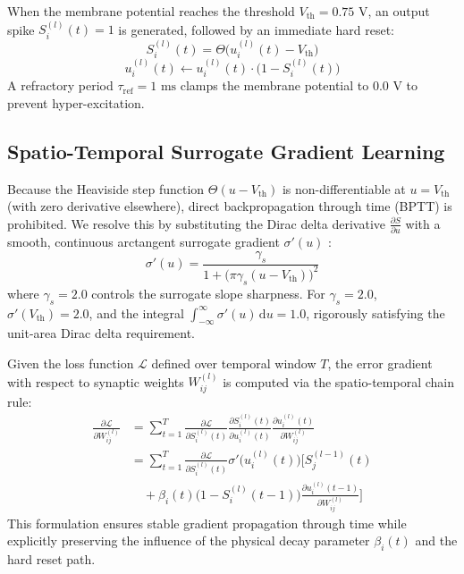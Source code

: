 \documentclass[journal]{IEEEtran}
\begin{document}
When the membrane potential reaches the threshold $V_{\text{th}} = 0.75\text{ V}$, an output spike $S_i^{(l)}(t) = 1$ is generated, followed by an immediate hard reset:
\begin{equation}
    S_i^{(l)}(t) = \Theta\big(u_i^{(l)}(t) - V_{\text{th}}\big)
\end{equation}
\begin{equation}
    u_i^{(l)}(t) \leftarrow u_i^{(l)}(t) \cdot \big(1 - S_i^{(l)}(t)\big)
\end{equation}
A refractory period $\tau_{\text{ref}} = 1\text{ ms}$ clamps the membrane potential to $0.0\text{ V}$ to prevent hyper-excitation.

\subsection{Spatio-Temporal Surrogate Gradient Learning}
Because the Heaviside step function $\Theta(u - V_{\text{th}})$ is non-differentiable at $u = V_{\text{th}}$ (with zero derivative elsewhere), direct backpropagation through time (BPTT) is prohibited. We resolve this by substituting the Dirac delta derivative $\frac{\partial S}{\partial u}$ with a smooth, continuous arctangent surrogate gradient $\sigma'(u)$ \cite{neftci2019surrogate, zenke2018superspike}:
\begin{equation}
    \sigma'(u) = \frac{\gamma_s}{1 + \big(\pi \gamma_s (u - V_{\text{th}})\big)^2}
\end{equation}
where $\gamma_s = 2.0$ controls the surrogate slope sharpness. For $\gamma_s = 2.0$, $\sigma'(V_{\text{th}}) = 2.0$, and the integral $\int_{-\infty}^{\infty} \sigma'(u)\,\mathrm{d}u = 1.0$, rigorously satisfying the unit-area Dirac delta requirement.

Given the loss function $\mathcal{L}$ defined over temporal window $T$, the error gradient with respect to synaptic weights $W_{ij}^{(l)}$ is computed via the spatio-temporal chain rule:
\begin{equation}
\begin{split}
    \frac{\partial \mathcal{L}}{\partial W_{ij}^{(l)}} 
    &= \sum_{t=1}^{T} \frac{\partial \mathcal{L}}{\partial S_i^{(l)}(t)} \frac{\partial S_i^{(l)}(t)}{\partial u_i^{(l)}(t)} \frac{\partial u_i^{(l)}(t)}{\partial W_{ij}^{(l)}} \\
    &= \sum_{t=1}^{T} \frac{\partial \mathcal{L}}{\partial S_i^{(l)}(t)} \sigma'\big(u_i^{(l)}(t)\big) \Big[ S_j^{(l-1)}(t) \\
    &\quad + \beta_i(t) \big(1 - S_i^{(l)}(t-1)\big) \frac{\partial u_i^{(l)}(t-1)}{\partial W_{ij}^{(l)}} \Big]
\end{split}
\end{equation}
This formulation ensures stable gradient propagation through time while explicitly preserving the influence of the physical decay parameter $\beta_i(t)$ and the hard reset path.
\end{document}
